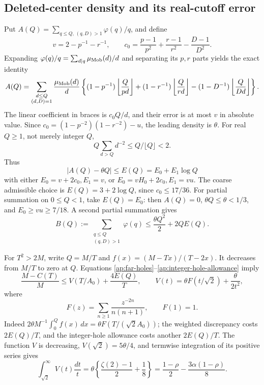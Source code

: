 \documentclass[11pt]{article}
\theoremstyle{definition}\newtheorem{definition}[theorem]{Definition}
\theoremstyle{remark}\newtheorem{remark}[theorem]{Remark}
\begin{document}
\subsection{Deleted-center density and its real-cutoff error}
\label{ap:deleted-density}
Put \(A(Q)=\sum_{q\leq Q,\,(q,D)>1}\varphi(q)/q\), and define
\[
 v=2-p^{-1}-r^{-1},\qquad
 c_0=\frac{p-1}{p^2}+\frac{r-1}{r^2}-\frac{D-1}{D^2}.
\]
Expanding \(\varphi(q)/q=\sum_{d\mid q}\mu_{\rm Mob}(d)/d\) and separating its
\(p,r\) parts yields the exact identity
\[
 A(Q)=\sum_{\substack{d\leq Q\\(d,D)=1}}\frac{\mu_{\rm Mob}(d)}d
 \left\{(1-p^{-1})\left\lfloor\frac Q{pd}\right\rfloor
 +(1-r^{-1})\left\lfloor\frac Q{rd}\right\rfloor
 -(1-D^{-1})\left\lfloor\frac Q{Dd}\right\rfloor\right\}.
\]
The linear coefficient in braces is \(c_0Q/d\), and their error is
at most \(v\) in absolute value.
Since \(c_0=(1-p^{-2})(1-r^{-2})-u\), the leading density is \(\theta\).
For real \(Q\geq1\), not merely integer \(Q\),
\[
 Q\sum_{d>Q}d^{-2}\leq Q/\lfloor Q\rfloor<2 .
\]
Thus
\begin{equation}
 |A(Q)-\theta Q|\leq E(Q)=E_0+E_1\log Q
 \label{ap:deleted-error}
\end{equation}
with either \(E_0=v+2c_0,E_1=v\), or \(E_0=vH_0+2c_0,E_1=vu\).
The coarse admissible choice is \(E(Q)=3+2\log Q\), since
\(c_0\leq17/36\). For partial summation on \(0\leq Q<1\), take \(E(Q)=E_0\):
then \(A(Q)=0\), \(\theta Q\leq\theta<1/3\), and \(E_0\geq vu\geq7/18\).
A second partial summation gives
\begin{equation}
 B(Q):=\sum_{\substack{q\leq Q\\(q,D)>1}}\varphi(q)
 \leq\frac{\theta Q^2}{2}+2QE(Q).
 \label{ap:integer-hole-allowance}
\end{equation}

For \(T^2>2M\), write \(Q=M/T\) and
\(f(x)=(M-Tx)/(T-2x)\). It decreases from \(M/T\) to zero at \(Q\).
Equations \eqref{ap:far-holes}--\eqref{ap:integer-hole-allowance} imply
\[
 \frac{M-C(T)}M\leq V(T/A_0)+\frac{4E(Q)}T,
 \qquad
 V(t)=\theta F(t/\sqrt2)+\frac{\theta}{2t^2},
\]
where
\[
 F(z)=\sum_{n\geq1}\frac{z^{-2n}}{n(n+1)},\qquad F(1)=1.
\]
Indeed \(2\theta M^{-1}\int_0^Q f(x)\,dx=\theta F(T/(\sqrt2A_0))\);
the weighted discrepancy costs \(2E(Q)/T\), and the integer-hole
allowance costs another \(2E(Q)/T\).
The function \(V\) is decreasing, \(V(\sqrt2)=5\theta/4\), and termwise
integration of its positive series gives
\begin{equation}
 \int_{\sqrt2}^{\infty}V(t)\frac{dt}{t}
 =\theta\left\{\frac{\zeta(2)-1}{2}+\frac18\right\}
 =\frac{1-\rho}{2}-\frac{3\alpha(1-\rho)}8 .
 \label{ap:far-integral}
\end{equation}
\end{document}
